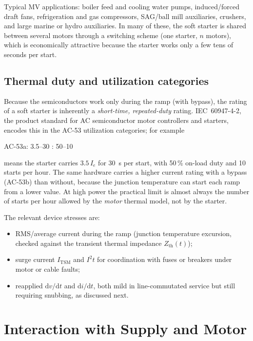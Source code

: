 Typical MV applications: boiler feed and cooling water pumps, induced/forced
draft fans, refrigeration and gas compressors, SAG/ball mill auxiliaries,
crushers, and large marine or hydro auxiliaries. In many of these, the soft
starter is shared between several motors through a switching scheme (one
starter, $n$ motors), which is economically attractive because the starter
works only a few tens of seconds per start.

\subsection{Thermal duty and utilization categories}

Because the semiconductors work only during the ramp (with bypass), the
rating of a soft starter is inherently a \emph{short-time, repeated-duty}
rating. IEC~60947-4-2, the product standard for AC semiconductor motor
controllers and starters, encodes this in the AC-53 utilization categories;
for example
\begin{center}
AC-53a: 3.5--30 : 50--10
\end{center}
means the starter carries $3.5\,I_e$ for \SI{30}{\second} per start, with
50\,\% on-load duty and 10 starts per hour. The same hardware carries a
higher current rating with a bypass (AC-53b) than without, because the
junction temperature can start each ramp from a lower value. At high power
the practical limit is almost always the number of starts per hour allowed
by the \emph{motor} thermal model, not by the starter.

The relevant device stresses are:
\begin{itemize}
  \item RMS/average current during the ramp (junction temperature excursion,
        checked against the transient thermal impedance $Z_\mathrm{th}(t)$);
  \item surge current $I_\mathrm{TSM}$ and $I^2t$ for coordination with
        fuses or breakers under motor or cable faults;
  \item reapplied $\mathrm{d}v/\mathrm{d}t$ and $\mathrm{d}i/\mathrm{d}t$,
        both mild in line-commutated service but still requiring snubbing,
        as discussed next.
\end{itemize}

\section{Interaction with Supply and Motor}

